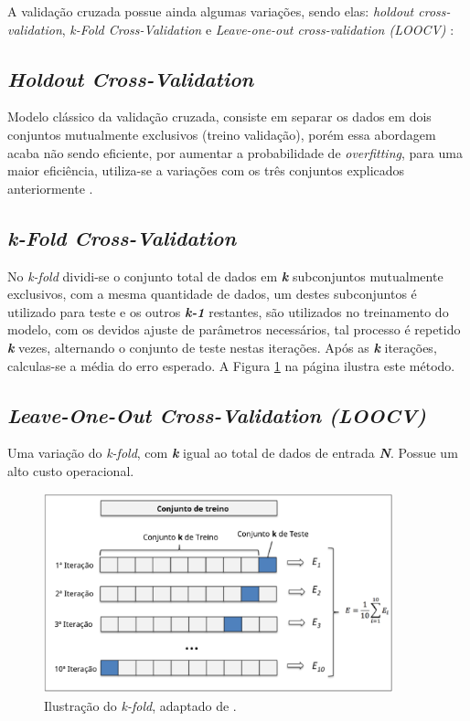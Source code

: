 A validação cruzada possue ainda algumas variações, sendo elas: \textit{holdout cross-validation}, \textit{k-Fold Cross-Validation} e \textit{Leave-one-out cross-validation (LOOCV)} \cite{james2013introduction}:


\subsection{\textit{Holdout Cross-Validation}}
Modelo clássico da validação cruzada, consiste em separar os dados em dois conjuntos mutualmente exclusivos (treino validação), porém essa abordagem acaba não sendo eficiente, por aumentar a probabilidade de \textit{overfitting}, para uma maior eficiência, utiliza-se a variações com os três conjuntos explicados anteriormente \cite{raschka2015python}.

\subsection{\textit{k-Fold Cross-Validation}}
No \textit{k-fold} dividi-se o conjunto total de dados em \textbf{\textit{k}} subconjuntos mutualmente exclusivos, com a mesma quantidade de dados, um destes subconjuntos é utilizado para teste e os outros \textbf{\textit{k-1}} restantes, são utilizados no treinamento do modelo, com os devidos ajuste de parâmetros necessários, tal processo é repetido \textbf{\textit{k}} vezes, alternando o conjunto de teste nestas iterações. Após as \textbf{\textit{k}} iterações, calculas-se a média do erro esperado. A Figura \ref{kfold} na página \pageref{kfold} ilustra este método.

\subsection{\textit{Leave-One-Out Cross-Validation (LOOCV)}} Uma variação do \textit{k-fold}, com \textbf{\textit{k}} igual ao total de dados de entrada \textbf{\textit{N}}. Possue um alto custo operacional.

\begin{figure}[!htb]
    \centering
     \includegraphics[width=0.9\textwidth]{figuras/kfold.eps}
     \caption{Ilustração do \textit{k-fold}, adaptado de .}
     \label{kfold}
\end{figure}

